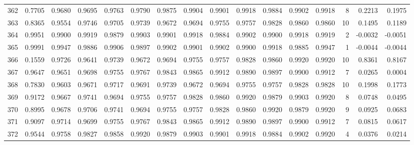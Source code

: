 \begin{tabular}{lrrrrrrrrrrrrrrr}
362 &      0.7705 &  0.9680 &  0.9695 &  0.9763 &  0.9790 &  0.9875 &  0.9904 &  0.9901 &  0.9918 &  0.9884 &   0.9902 &     0.9918 &      8 &                    0.2213 &                     0.1975 \\
363 &      0.8365 &  0.9554 &  0.9746 &  0.9705 &  0.9739 &  0.9672 &  0.9694 &  0.9755 &  0.9757 &  0.9828 &   0.9860 &     0.9860 &     10 &                    0.1495 &                     0.1189 \\
364 &      0.9951 &  0.9900 &  0.9919 &  0.9879 &  0.9903 &  0.9901 &  0.9918 &  0.9884 &  0.9902 &  0.9900 &   0.9918 &     0.9919 &      2 &                   -0.0032 &                    -0.0051 \\
365 &      0.9991 &  0.9947 &  0.9886 &  0.9906 &  0.9897 &  0.9902 &  0.9901 &  0.9902 &  0.9900 &  0.9918 &   0.9885 &     0.9947 &      1 &                   -0.0044 &                    -0.0044 \\
366 &      0.1559 &  0.9726 &  0.9641 &  0.9739 &  0.9672 &  0.9694 &  0.9755 &  0.9757 &  0.9828 &  0.9860 &   0.9920 &     0.9920 &     10 &                    0.8361 &                     0.8167 \\
367 &      0.9647 &  0.9651 &  0.9698 &  0.9755 &  0.9767 &  0.9843 &  0.9865 &  0.9912 &  0.9890 &  0.9897 &   0.9900 &     0.9912 &      7 &                    0.0265 &                     0.0004 \\
368 &      0.7830 &  0.9603 &  0.9671 &  0.9717 &  0.9691 &  0.9739 &  0.9672 &  0.9694 &  0.9755 &  0.9757 &   0.9828 &     0.9828 &     10 &                    0.1998 &                     0.1773 \\
369 &      0.9172 &  0.9667 &  0.9741 &  0.9694 &  0.9755 &  0.9757 &  0.9828 &  0.9860 &  0.9920 &  0.9879 &   0.9903 &     0.9920 &      8 &                    0.0748 &                     0.0495 \\
370 &      0.8995 &  0.9678 &  0.9706 &  0.9741 &  0.9694 &  0.9755 &  0.9757 &  0.9828 &  0.9860 &  0.9920 &   0.9879 &     0.9920 &      9 &                    0.0925 &                     0.0683 \\
371 &      0.9097 &  0.9714 &  0.9699 &  0.9755 &  0.9767 &  0.9843 &  0.9865 &  0.9912 &  0.9890 &  0.9897 &   0.9900 &     0.9912 &      7 &                    0.0815 &                     0.0617 \\
372 &      0.9544 &  0.9758 &  0.9827 &  0.9858 &  0.9920 &  0.9879 &  0.9903 &  0.9901 &  0.9918 &  0.9884 &   0.9902 &     0.9920 &      4 &                    0.0376 &                     0.0214 \\

\end{tabular}
